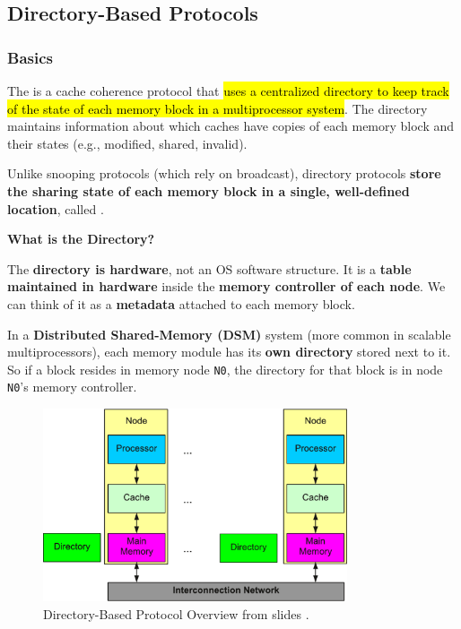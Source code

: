 \subsection{Directory-Based Protocols}

\subsubsection{Basics}

The  is a cache coherence protocol that \hl{uses a centralized directory to keep track of the state of each memory block in a multiprocessor system}. The directory maintains information about which caches have copies of each memory block and their states (e.g., modified, shared, invalid).

\highspace
Unlike snooping protocols (which rely on broadcast), directory protocols \textbf{store the sharing state of each memory block in a single, well-defined location}, called .

\highspace
\begin{flushleft}
    \textcolor{Green3}{ \textbf{What is the Directory?}}
\end{flushleft}
The \textbf{directory is hardware}, not an OS software structure. It is a \textbf{table maintained in hardware} inside the \textbf{memory controller of each node}. We can think of it as a \textbf{metadata} attached to each memory block.

\highspace
In a \textbf{Distributed Shared-Memory (DSM)} system (more common in scalable multiprocessors), each memory module has its \textbf{own directory} stored next to it. So if a block resides in memory node \texttt{N0}, the directory for that block is in node \texttt{N0}'s memory controller.

\begin{figure}[!htp]
    \centering
    \includegraphics[width=0.8\textwidth]{img/directory-based-protocol-2.pdf}
    \caption{Directory-Based Protocol Overview from slides \cite{course-slides-polimi}.}
\end{figure}

